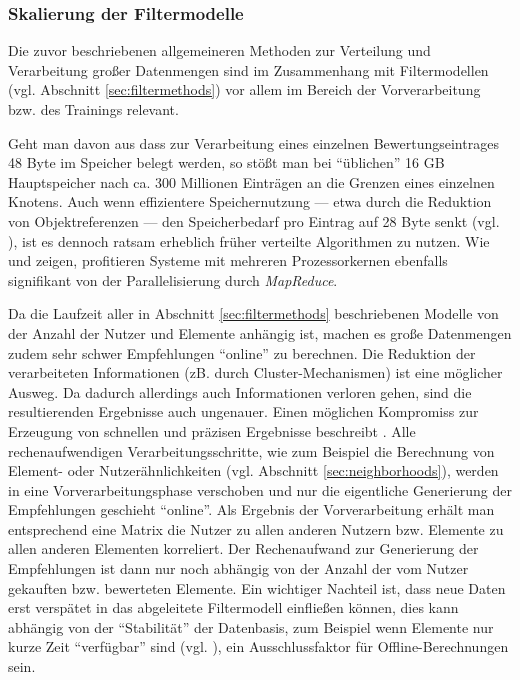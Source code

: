 \subsubsection{Skalierung der Filtermodelle}

Die zuvor beschriebenen allgemeineren Methoden zur Verteilung und Verarbeitung großer Datenmengen sind im Zusammenhang mit Filtermodellen (vgl. Abschnitt \ref{sec:filtermethods}) vor allem im Bereich der Vorverarbeitung bzw. des Trainings relevant. 

Geht man davon aus dass zur Verarbeitung eines einzelnen Bewertungseintrages 48 Byte im Speicher belegt werden, so stößt man bei ``üblichen'' 16 GB Hauptspeicher nach ca. 300 Millionen Einträgen an die Grenzen eines einzelnen Knotens. Auch wenn effizientere Speichernutzung --- etwa durch die Reduktion von Objektreferenzen --- den Speicherbedarf pro Eintrag auf 28 Byte senkt (vgl. \citep{mia}), ist es dennoch ratsam erheblich früher verteilte Algorithmen zu nutzen. Wie \citep{mapred06} und \cite{jiang11} zeigen, profitieren Systeme mit mehreren Prozessorkernen ebenfalls signifikant von der Parallelisierung durch \textit{MapReduce}.

Da die Laufzeit aller in Abschnitt \ref{sec:filtermethods} beschriebenen Modelle von der Anzahl der Nutzer und Elemente anhängig ist, machen es große Datenmengen zudem sehr schwer Empfehlungen ``online'' zu berechnen. Die Reduktion der verarbeiteten Informationen (zB. durch Cluster-Mechanismen) ist eine möglicher Ausweg. Da dadurch allerdings auch Informationen verloren gehen, sind die resultierenden Ergebnisse auch ungenauer. Einen möglichen Kompromiss zur Erzeugung von schnellen und präzisen Ergebnisse beschreibt \citep{linden03}. Alle rechenaufwendigen Verarbeitungsschritte, wie zum Beispiel die Berechnung von Element- oder Nutzerähnlichkeiten (vgl. Abschnitt \ref{sec:neighborhoods}), werden in eine Vorverarbeitungsphase verschoben und nur die eigentliche Generierung der Empfehlungen geschieht ``online''. Als Ergebnis der Vorverarbeitung erhält man entsprechend eine Matrix die Nutzer zu allen anderen Nutzern bzw. Elemente zu allen anderen Elementen korreliert. Der Rechenaufwand zur Generierung der Empfehlungen ist dann nur noch abhängig von der Anzahl der vom Nutzer gekauften bzw. bewerteten Elemente. Ein wichtiger Nachteil ist, dass neue Daten erst verspätet in das abgeleitete Filtermodell einfließen können, dies kann abhängig von der ``Stabilität'' der Datenbasis, zum Beispiel wenn Elemente nur kurze Zeit ``verfügbar'' sind (vgl. \citep{Cornelis20074906}), ein Ausschlussfaktor für Offline-Berechnungen sein. \citep{linden03}


